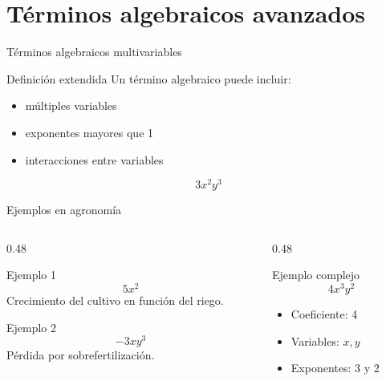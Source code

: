 \section{Términos algebraicos avanzados}
\begin{frame}{Términos algebraicos multivariables}
	
	\begin{block}{Definición extendida}
		Un término algebraico puede incluir:
		
		\begin{itemize}
			\item múltiples variables
			\pause
			\item exponentes mayores que 1
			\pause
			\item interacciones entre variables
		\end{itemize}
	\end{block}
	
	\pause
	
	\[
	3x^2y^3
	\]
	
	\pause
	
	
\end{frame}

\begin{frame}{Ejemplos en agronomía}
	
	\begin{columns}
		\begin{column}{0.48\textwidth}
			
			\begin{block}{Ejemplo 1}
				\[
				5x^2
				\]
				\pause
				Crecimiento del cultivo en función del riego.
			\end{block}
			
			\pause
			
			\begin{block}{Ejemplo 2}
				\[
				-3xy^3
				\]
				\pause
				Pérdida por sobrefertilización.
			\end{block}
			
		\end{column}
		
		\begin{column}{0.48\textwidth}
			
			\begin{exampleblock}{Ejemplo complejo}
				\[
				4x^3y^2
				\]
				\pause
				
				\begin{itemize}
					\item Coeficiente: 4
					\pause
					\item Variables: \(x,y\)
					\pause
					\item Exponentes: 3 y 2
				\end{itemize}
				
			\end{exampleblock}
			
		\end{column}
	\end{columns}
	
\end{frame}

